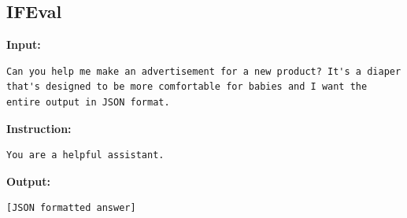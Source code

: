 \documentclass[11pt]{article}
\begin{document}
\subsection{IFEval}
\textbf{Input:}
\begin{lstlisting}
Can you help me make an advertisement for a new product? It's a diaper that's designed to be more comfortable for babies and I want the entire output in JSON format.
\end{lstlisting}
\textbf{Instruction:}
\begin{lstlisting}
You are a helpful assistant.
\end{lstlisting}
\textbf{Output:}
\begin{lstlisting}
[JSON formatted answer]
\end{lstlisting}
\end{document}
